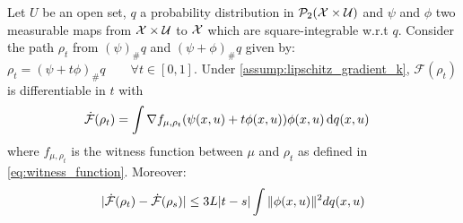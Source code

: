 \begin{lemma}\label{lem:derivative_mmd_augmented}
Let $U$ be an open set, $q$ a probability distribution in $\mathcal{P}_2({{\mathcal X}} \times \mathcal{U})$ and $\psi$ and $\phi$ two measurable maps from  ${{\mathcal X}} \times\mathcal{U} $ to ${{\mathcal X}}$  which are square-integrable w.r.t $q$. Consider the path $\rho_t$ from  $(\psi)_{\#}q$ and $(\psi+\phi)_{\#}q$ given by: $\rho_t=  (\psi+t\phi)_{\#}q \qquad \forall t\in [0,1]$. Under \cref{assump:lipschitz_gradient_k}, $\mathcal{F}(\rho_t)$ is differentiable in $t$ with
	\begin{align*}
		\dot{{{\mathcal F}}}(\rho_t)&=\int \nabla f_{\mu,\rho_t}(\psi(x,u)+t\phi(x,u)) \phi(x,u)\mathop{}\!\mathrm{d} q(x,u)
	\end{align*}
where $f_{\mu,\rho_t}$ is the witness function between $\mu$ and $\rho_t$ as defined in \cref{eq:witness_function}.	
Moreover:
\begin{align*}
		\vert \dot{{{\mathcal F}}}(\rho_t) - \dot{{{\mathcal F}}}(\rho_s) \vert \leq 3L\vert t-s \vert\int \Vert \phi(x,u) \Vert^2 dq(x,u)
\end{align*}
\end{lemma}
